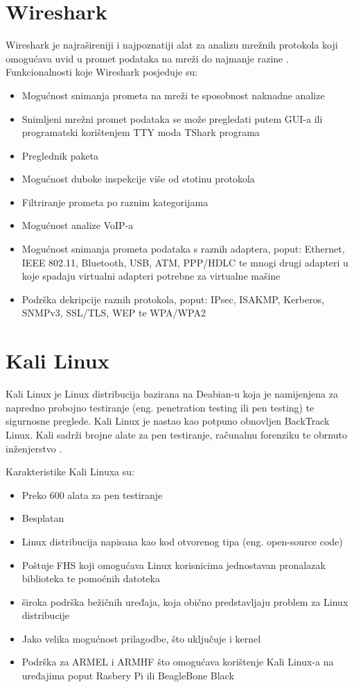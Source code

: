 \documentclass[12pt, oneside, onecolumn]{book}
\begin{document}
{\section{Wireshark}

Wireshark je najrašireniji i najpoznatiji alat za analizu mrežnih protokola koji omogućava uvid u promet podataka na mreži do najmanje razine \cite{wsh}. Funkcionalnosti koje Wireshark posjeduje su:

\begin{itemize}
\item Mogućnost snimanja prometa na mreži te sposobnost naknadne analize
\item Snimljeni mrežni promet podataka se može pregledati putem GUI-a ili programatski korištenjem TTY moda TShark programa
\item Preglednik paketa
\item Mogućnost duboke inspekcije više od stotinu protokola
\item Filtriranje prometa po raznim kategorijama
\item Mogućnost analize VoIP-a
\item Mogućnost snimanja prometa podataka s raznih adaptera, poput: Ethernet, IEEE 802.11, Bluetooth, USB, ATM, PPP/HDLC te mnogi drugi adapteri u koje spadaju virtualni adapteri potrebne za virtualne mašine
\item Podrška dekripcije raznih protokola, poput: IPsec, ISAKMP, Kerberos, SNMPv3, SSL/TLS, WEP te WPA/WPA2
\end{itemize}

\section{Kali Linux}
Kali Linux je Linux distribucija bazirana na Deabian-u koja je namijenjena za napredno probojno testiranje (eng. penetration testing ili pen testing) te sigurnosne preglede. 
Kali Linux je nastao kao potpuno obnovljen BackTrack Linux. Kali sadrži brojne alate za pen testiranje, računalnu forenziku te obrnuto inženjerstvo \cite{kali}.

Karakteristike Kali Linuxa su:

\begin{itemize}
\item Preko 600 alata za pen testiranje
\item Besplatan
\item Linux distribucija napisana kao kod otvorenog tipa (eng. open-source code)
\item Poštuje FHS koji omogućava Linux korisnicima jednostavan pronalazak biblioteka te pomoćnih datoteka
\item široka podrška bežičnih uređaja, koja obično predstavljaju problem za Linux distribucije
\item Jako velika mogućnost prilagodbe, što uključuje i kernel
\item Podrška za ARMEL i ARMHF što omogućava korištenje Kali Linux-a na uređajima poput Rasbery Pi ili BeagleBone Black
\end{itemize}

}
\end{document}
